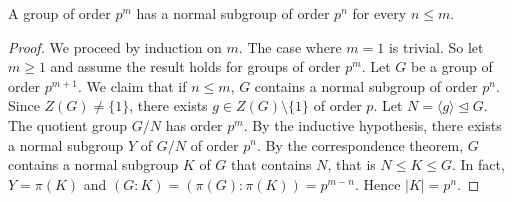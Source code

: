\begin{theorem}
    A group of order $p^m$ has a normal subgroup of order
    $p^n$ for every $n\leq m$.
\end{theorem}

\begin{proof}
    We proceed by induction on $m$. The case where $m=1$ is trivial. So let $m\geq1$ and 
    assume the result holds for groups of order $p^m$. Let
    $G$ be a group of order $p^{m+1}$.
    We claim that if $n\leq m$, $G$ contains a normal subgroup of
    order $p^n$. Since $Z(G)\ne\{1\}$, there exists
    $g\in Z(G)\setminus\{1\}$ of order $p$. Let
$N=\langle g\rangle\unlhd G$. The quotient 
group $G/N$ has order $p^m$. By the inductive hypothesis, 
there exists a normal subgroup $Y$ of $G/N$ of order $p^n$. By the correspondence theorem, $G$ contains a normal subgroup $K$ of $G$ 
that contains $N$, that is $N\leq K\leq G$. In fact, 
$Y=\pi(K)$ and 
$(G:K)=(\pi(G):\pi(K))=p^{m-n}$. Hence $|K|=p^n$.
\end{proof}
